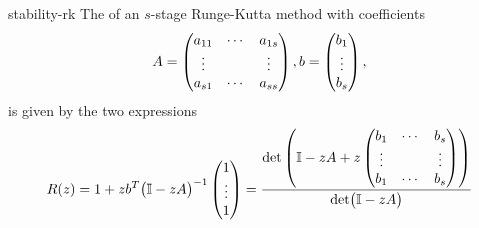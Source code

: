 \begin{Lemma}{stability-rk}
  The  of an $s$-stage Runge-Kutta method with
  coefficients
  \begin{gather*}
    A=
    \begin{pmatrix}
      a_{11} & \cdots & a_{1s}
      \\ \vdots & & \vdots \\
      a_{s1} & \cdots & a_{ss}
    \end{pmatrix},
    b =
    \begin{pmatrix}
      b_1 \\ \vdots \\ b_s
    \end{pmatrix},
  \end{gather*}
  is given by the two expressions
  \begin{gather}
    \label{eq:stability-rk:1}
    R(z) = 1+ z b^T \bigl(\mathbb I-zA\bigr)^{-1}
    \begin{pmatrix}
      1\\\vdots\\1
    \end{pmatrix}
    = \frac{\operatorname{det}\left(\mathbb I-zA+z
        \begin{pmatrix}
          b_1 & \cdots & b_s\\
          \vdots & & \vdots \\
          b_1 & \cdots & b_s
        \end{pmatrix}\right)
}{\operatorname{det}\bigl(\mathbb I-zA\bigr)}
  \end{gather}
\end{Lemma}

